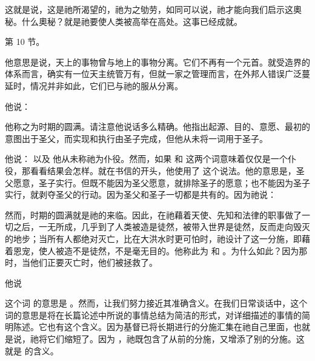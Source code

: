 这就是说，这是祂所渴望的，祂为之劬劳，如同可以说，祂才能向我们启示这奧秘。什么奧秘？就是祂要使人类被高举在高处。这事已经成就。\par

第 10 节。\par

他意思是说，天上的事物曾与地上的事物分离。它们不再有一个元首。就受造界的体系而言，确实有一位天主统管万有，但就一家之管理而言，在外邦人错误广泛蔓延时，情况并非如此，它们已与祂的服从分离。\par

他说：\par

他称之为时期的圆满。请注意他说话多么精确。他指出起源、目的、意愿、最初的意图出于圣父，而实现和执行由圣子完成，但他从未将一词用于圣子。\par

他说： 以及  他从未称祂为仆役。然而，如果  和  这两个词意味着仅仅是一个仆役，那看看结果会怎样。就在书信的开头，他使用了  这个说法。他的意思是，圣父愿意，圣子实行。但既不能因为圣父愿意，就排除圣子的愿意；也不能因为圣子实行，就剥夺圣父的行动。因为圣父和圣子一切都是共有的。因为祂说： \par

然而，时期的圆满就是祂的来临。因此，在祂藉着天使、先知和法律的职事做了一切之后，一无所成，几乎到了人类被造是徒然，被带入世界是徒然，反而走向毁灭的地步；当所有人都绝对灭亡，比在大洪水时更可怕时，祂设计了这一分施，即藉着恩宠，使人被造不是徒然，不是毫无目的。他称此为  和 。为什么如此？因为那时，当他们正要灭亡时，他们被拯救了。\par

他说 \par

这个词  的意思是 。然而，让我们努力接近其准确含义。在我们日常谈话中，这个词的意思是将在长篇论述中所说的事情总结为简洁的形式，对详细描述的事情的简明陈述。它也有这个含义。因为基督已将长期进行的分施汇集在祂自己里面，也就是说，祂将它们缩短了。因为  ，祂既包含了从前的分施，又增添了别的分施。这就是  的含义。\par

